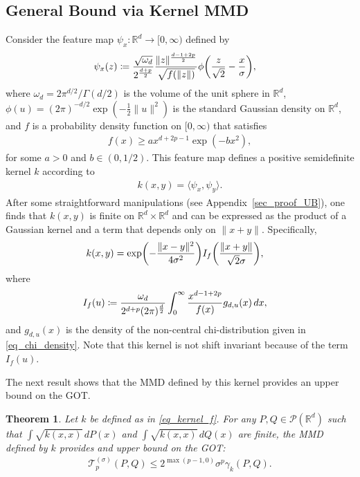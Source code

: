 \documentclass{article}
\newtheorem{theorem}{Theorem}
\theoremstyle{definition}
\newcommand{\reals}{\mathbb{R}}
\newcommand{\cP}{\mathcal{P}}
\newcommand{\cT}{\mathcal{T}}
\newcommand{\appname}{Appendix}
\newcommand{\appname}{Supplement}
\let\originalleft\left
\let\originalright\right
\renewcommand{\left}{\mathopen{}\mathclose\bgroup\originalleft}
\renewcommand{\right}{\aftergroup\egroup\originalright}
\begin{document}
\subsection{General Bound via Kernel MMD}
Consider the feature map $\psi_x \colon \reals^d \to [0, \infty)$ defined by
\begin{align}
    \psi_x(z) &\coloneqq \frac{ \sqrt{\omega_d}}{ 2^\frac{d+p}{2}} \frac{ \|z\|^\frac{d-1  + 2p}{2}}{ \sqrt{ f(\|z\|)}} \phi\left(\frac{ z}{\sqrt{2}}  - \frac{ x}{\sigma} \right ),
\end{align}
where  $\omega_d = 2\pi^{d/2} / \Gamma(d/2)$ is the volume of the unit sphere in $\reals^d$, $\phi(u) = (2\pi)^{-d/2} \exp( -\frac{1}{2} \|u\|^2)$ is the standard Gaussian density on $\reals^d$, and $f$ is a probability density function on $[0, \infty)$ that satisfies 
\begin{align}
f(x) \ge a x^{d + 2p -1}  \exp( - b  x^2),
\label{eq:fLB}
\end{align}
for some $a > 0$ and $b \in (0,1/2)$. 
This feature map defines a positive semidefinite kernel $k$ according to
\begin{align*}
    k(x,y) = \langle \psi_x, \psi_y \rangle.
\end{align*}
After some straightforward manipulations (see \appname~\ref{sec_proof_UB}), one finds that $k(x,y)$ is finite on $\reals^d \times \reals^d$ and can be expressed as the product of a Gaussian kernel and a term that depends only on $\|x+y\|$. Specifically, 
\begin{align}
     k(x,y) & = \exp\left( -\frac{ \|x-y\|^2}{ 4 \sigma^2}\right) I_f\left( \frac{ \|x+y\|}{\sqrt{2} \sigma} \right), \label{eq_kernel_f}
\end{align}
where
\begin{align}
    I_f(u) &\coloneqq \frac{ \omega_d}{2^{d + p} ( 2\pi)^{\frac{d}{2}} }\int_0^\infty  \frac{ x^{d-1+2p}}{ f(x)} g_{d,u}\left(x \right)   \, dx, \label{eq:If} 
\end{align}
and $g_{d,u}(x)$ is the density of the non-central chi-distribution given in \eqref{eq_chi_density}. Note that this kernel is not shift invariant because of the term $I_f(u)$. 

The next result shows that the MMD defined by this kernel provides an upper bound on the GOT.  

\begin{theorem}\label{thm_general_UB}
Let $k$ be defined as in \eqref{eq_kernel_f}. For any $P, Q \in \cP(\reals^d)$ such that $\int \sqrt{k(x,x)} \, dP(x)$ and  $\int \sqrt{k(x,x)} \, dQ(x)$ are finite, the MMD defined by $k$ provides and upper bound on the GOT:
\begin{align*}
\cT^{(\sigma)}_p(P,Q) \le  2^{\max(p-1,0)} \sigma^p \gamma_k(P,Q).
\end{align*}
\end{theorem}
\end{document}
